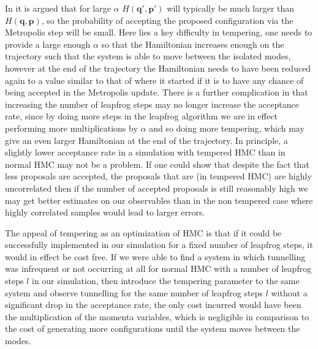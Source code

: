 \documentclass[12pt]{article}
\begin{document}
    In \cite{neal_2011} it is argued that for large $\alpha$ $H\left(\bm{q}',\bm{p}'\right)$ will typically be much larger than $H\left(\bm{q},\bm{p}\right)$, so the probability of accepting the proposed configuration via the Metropolis step will be small. Here lies a key difficulty in tempering, one needs to provide a large enough $\alpha$ so that the Hamiltonian increases enough on the trajectory such that the system is able to move between the isolated modes, however at the end of the trajectory the Hamiltonian needs to have been reduced again to a value similar to that of where it started if it is to have any chance of being accepted in the Metropolis update. There is a further complication in that increasing the number of leapfrog steps may no longer increase the acceptance rate, since by doing more steps in the leapfrog algorithm we are in effect performing more multiplications by $\alpha$ and so doing more tempering, which may give an even larger Hamiltonian at the end of the trajectory. In principle, a slightly lower acceptance rate in a simulation with tempered HMC than in normal HMC may not be a problem. If one could show that despite the fact that less proposals are accepted, the proposals that are (in tempered HMC) are highly uncorrelated then if the number of accepted proposals is still reasonably high we may get better estimates on our observables than in the non tempered case where highly correlated samples would lead to larger errors. 

    The appeal of tempering as an optimization of HMC is that if it could be successfully implemented in our simulation for a fixed number of leapfrog steps, it would in effect be cost free. If we were able to find a system in which tunnelling was infrequent or not occurring at all for normal HMC with a number of leapfrog steps $l$ in our simulation, then introduce the tempering parameter to the same system and observe tunnelling for the same number of leapfrog steps $l$ without a significant drop in the acceptance rate, the only cost incurred would have been the multiplication of the momenta variables, which is negligible in comparison to the cost of generating more configurations until the system moves between the modes.
\end{document}
